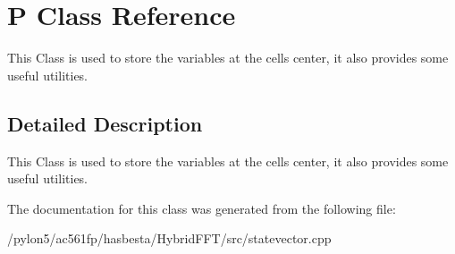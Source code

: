 \hypertarget{classP}{\section{P Class Reference}
\label{classP}
}


This Class is used to store the variables at the cells center, it also provides some useful utilities.  




\subsection{Detailed Description}
This Class is used to store the variables at the cells center, it also provides some useful utilities. 

The documentation for this class was generated from the following file\-:\begin{DoxyCompactItemize}
\item 
/pylon5/ac561fp/hasbesta/\-Hybrid\-F\-F\-T/src/statevector.\-cpp\end{DoxyCompactItemize}
